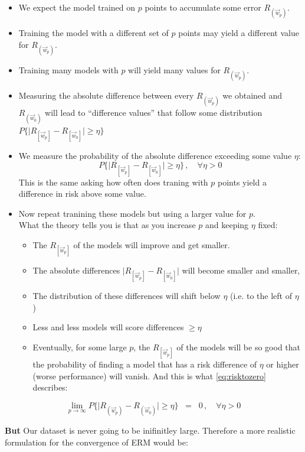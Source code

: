 \begin{frame}
			\begin{itemize}
			\item We expect the model trained on $p$ points to accumulate some error $R_{(\vec w_p)}$.
			\item Training the model with a different set of $p$ points may yield a different value for $R_{(\vec w_p)}$.
			\item Training many models with $p$ will yield many values for $R_{(\vec w_p)}$.
			\item Measuring the absolute difference between every $R_{(\vec w_p)}$ we obtained and $R_{(\vec w_0)}$ will lead to ``difference values'' that follow some distribution $P\bigg\{ 
					{
						\Big|R_{[\vec w_p]} - R_{[\vec w_0]}\Big| 
					}
				\geq \eta \bigg\}$
			\item We measure the probability of the absolute difference exceeding some value $\eta$:
			\begin{equation}
			P\bigg\{ 
					{
						\Big|R_{[\vec w_p]} - R_{[\vec w_0]}\Big| 
					}
				\geq \eta \bigg\}\,, \quad \forall \eta > 0
			\end{equation}
			This is the same asking how often does traning with $p$ points yield a difference in risk above some value.
			\item Now repeat tranining these models but using a larger value for $p$.\\
			What the theory tells you is that as you increase $p$ and keeping $\eta$ fixed:
			\begin{itemize}
			\item The $R_{[\vec w_p]}$ of the models will improve and get smaller.
			\item The absolute differences $\Big|R_{[\vec w_p]} - R_{[\vec w_0]}\Big|$ will become smaller and smaller,
			\item The distribution of these differences will shift below $\eta$ (i.e. to the left of $\eta$)
			\item Less and less models will score differences $\ge \eta$
			\item Eventually, for some large $p$, the $R_{[\vec w_p]}$ of the models will be so good that the probability of finding a model that has a risk difference of $\eta$ or higher (worse performance) will vanish. And this is what \eqref{eq:risktozero} describes:
			\end{itemize}
			
			\end{itemize}
			
			\begin{equation}
				\lim_{p \to \infty} P\bigg\{ 
					{
						\Big|R_{(\vec w_p)} - R_{(\vec w_0)}\Big| 
					}
				\geq \eta \bigg\}\;\;=\;\; 0 \,, \quad \forall \eta > 0
				\label{eq:risktozero}
			\end{equation}
			
			\textbf{But} Our dataset is never going to be inifinitley large. Therefore a more realistic formulation for the convergence of ERM would be:
			
			
\end{frame}

